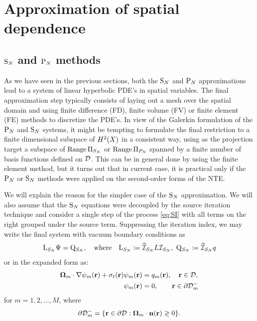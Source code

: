 \section{Approximation of spatial dependence}
\subsection{$\SN$ and $\PN$ methods}\label{sec:snpnspatial}
As we have seen in the previous sections, both the $\SN$ and $\PN$ approximations lead to a system of linear
hyperbolic PDE's in spatial variables. The final approximation step typically consists of laying out a mesh  
over the spatial domain and using finite difference (FD), finite volume (FV) or finite element (FE) methods to
discretize the PDE's. 
In view of the Galerkin formulation of the $\PN$ and $\SN$ systems, it might be tempting to formulate the final
restriction to a finite dimensional subspace of $\Hp[2](X)$ in a consistent way, using as the projection target a
subspace of $\Rng\Projop[S_N]$ or $\Rng\Projop[P_N]$ spanned by a finite number of basis functions defined on $\VV$.
This can be in general done by using the finite element method, but it turns out that in current case, it is practical 
only if the $\PN$ or $\SN$ methods were applied on the second-order forms of the NTE. 

We will explain the reason for the
simpler case of the $\SN$ approximation. We will also assume that the $\SN$ equations were decoupled by the source
iteration technique and consider a single step of the process \eqref{eq:SI} with all terms on the right grouped under
the source term. Suppressing the iteration index, we may write the final system with vacuum boundary conditions as
\begin{equation}\label{eq:SNSI1}
	\mathrm{L}_{S_N} \Psi = \mathrm{Q}_{S_N},\quad\mbox{where}\quad \mathrm{L}_{S_N} \coloneqq \PihSN L \PiSN,\ \mathrm{Q}_{S_N}
	\coloneqq \PihSN q
\end{equation}
or in the expanded form as:
\begin{align}
	\bomega_m\cdot\nabla\psi_m(\br) + \sigma_t(\br)\psi_m(\br) &= q_m(\br),\quad \br \in \VV, \label{eq:SNSI2}\\
	\psi_m(\br) &= 0,\qquad \br \in \pVm[-]{m} \label{eq:SNSI2_bc}
\end{align}
for $m = 1,2,\ldots,M$,
where
$$
	\pVm[-]{m} = \{\br\in\pV : \bomega_m\cdot\bn(\br) \gtrless 0\}.
$$

